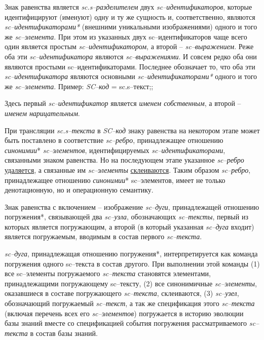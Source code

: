 Знак равенства является \textit{sc.s--разделителем} двух \textit{sc--идентификаторов}, которые идентифицируют (именуют) одну и ту же сущность и, соответственно, являются \textit{sc--идентификаторами*} (внешними уникальными изображениями) одного и того же \textit{sc--элемента}. При этом из указанных двух sc--идентификаторов чаще всего один является простым \textit{sc--идентификатором}, а второй – \textit{sc--выражением}. Реже оба эти \textit{sc--идентификатора} являются \textit{sc--выражениями}. И совсем редко оба они являются простыми sc--идентификаторами. Последнее обозначает то, что оба эти \textit{sc--идентификатора} являются основными \textit{sc--идентификаторами*} одного и того же \textit{sc--элемента}. Пример:
\textit{SC--код} = sc.s--текст;;


Здесь первый \textit{sc--идентификатор} является \textit{именем собственным}, а второй -- \textit{именем нарицательным}.

При трансляции \textit{sc.s--текста} в \textit{SC--код} знаку равенства на некотором этапе может быть поставлено в соответствие \textit{sc--ребро}, принадлежащее отношению \textit{синонимии}* \textit{sc--элементов}, идентифицируемых \mbox{\textit{sc--идентификаторами}}, связанными знаком равенства. Но на последующем этапе указанное \textit{sc--ребро} \uline{удаляется}, а связанные им \textit{sc--элементы} \uline{склеиваются}. Таким образом \textit{sc--ребро}, принадлежащее отношению \textit{синонимии}* sc--элементов, имеет не только денотационную, но и операционную семантику.

Знак равенства с включением -- изображение \textit{sc--дуги}, принадлежащей отношению погружения*, связывающей два \textit{sc--узла}, обозначающих \textit{sc--тексты}, первый из которых является погружающим, а второй (в который указанная \textit{sc--дуга} входит) является погружаемым, вводимым в состав первого \textit{sc--текста}. 

\textit{sc--дуга}, принадлежащая отношению погружения*, интерпретируется как команда погружения одного sc--текста в состав другого. При выполнении этой команды (1) все sc--элементы погружаемого \textit{sc--текста} становятся элементами, принадлежащими погружающему sc--тексту, (2) все синонимичные \textit{sc--элементы}, оказавшиеся в составе погружающего \textit{sc--текста}, склеиваются, (3) \textit{sc--узел}, обозначающий погружаемый \textit{sc--текст}, а так же спецификация этого \textit{sc--текста} (включая перечень всех его \textit{sc--элементов}) погружается в историю эволюции базы знаний вместе со спецификацией события погружения рассматриваемого \textit{sc--текста} в состав базы знаний.

